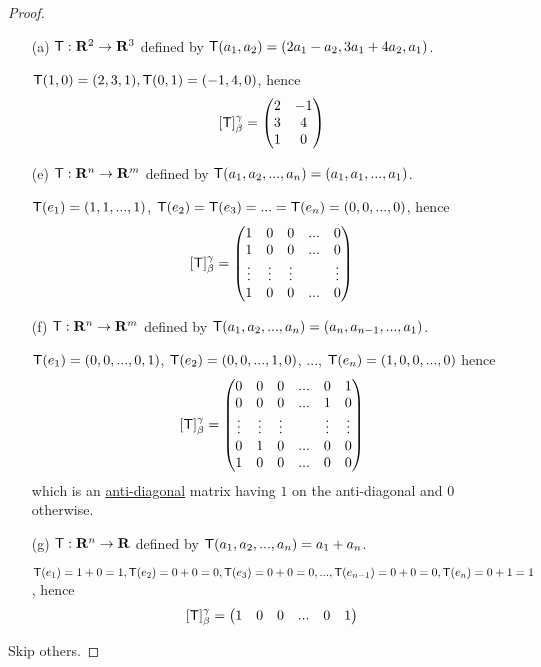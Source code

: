 \begin{proof} \ 

\begin{enumerate}
\item[(a)] \(\textsf{T}: \mathbf{R}^2 \to \mathbf{R}^3\) defined by \(\textsf{T}(a_1, a_2) = (2a_1 - a_2, 3a_1 + 4a_2, a_1)\).

\(\textsf{T}(1, 0) = (2, 3, 1), \textsf{T}(0, 1) = (-1, 4, 0)\), hence
\[
    [\textsf{T}]_{\beta}^{\gamma} = \begin{pmatrix} 2 & -1 \\ 3 & 4 \\ 1 & 0 \end{pmatrix}
\]

\item[(e)] \(\textsf{T}: \mathbf{R}^n \to \mathbf{R}^m\) defined by \(\textsf{T}(a_1, a_2, ..., a_n) = (a_1, a_1, ..., a_1)\).

\(\textsf{T}(e_1) = (1, 1, ..., 1)\),
\(\textsf{T}(e_2) = \textsf{T}(e_3) = ... = \textsf{T}(e_n) = (0, 0, ..., 0)\), hence
\[
    [\textsf{T}]_{\beta}^{\gamma} = \begin{pmatrix}
        1 & 0 & 0 & ... & 0 \\
        1 & 0 & 0 & ... & 0 \\
        \vdots & \vdots & \vdots & & \vdots \\
        1 & 0 & 0 & ... & 0
    \end{pmatrix}
\]

\item[(f)] \(\textsf{T}: \mathbf{R}^n \to \mathbf{R}^m\) defined by \(\textsf{T}(a_1, a_2, ..., a_n) = (a_n, a_{n - 1}, ..., a_1)\).

\(\textsf{T}(e_1) = (0, 0, ..., 0, 1)\), \(\textsf{T}(e_2) = (0, 0, ..., 1, 0)\), ..., \(\textsf{T}(e_n) = (1, 0, 0, ..., 0)\)
hence
\[
    [\textsf{T}]_{\beta}^{\gamma} = \begin{pmatrix}
        0 & 0 & 0 & ... & 0 & 1 \\
        0 & 0 & 0 & ... & 1 & 0 \\
        \vdots & \vdots & \vdots & & \vdots & \vdots \\
        0 & 1 & 0 & ... & 0 & 0 \\
        1 & 0 & 0 & ... & 0 & 0
    \end{pmatrix}
\]
which is an \href{https://www.wikiwand.com/en/Anti-diagonal_matrix}{anti-diagonal} matrix having \(1\) on the anti-diagonal and \(0\) otherwise.

\item[(g)] \(\textsf{T}: \mathbf{R}^n \to \mathbf{R}\) defined by \(\textsf{T}(a_1, a_2, ..., a_n) = a_1 + a_n\).

\(\textsf{T}(e_1) = 1 + 0 = 1, \textsf{T}(e_2) = 0 + 0 = 0, \textsf{T}(e_3) = 0 + 0 = 0, ..., \textsf{T}(e_{n - 1}) = 0 + 0 = 0, \textsf{T}(e_n) = 0 + 1 = 1\),
hence
\[
    [\textsf{T}]_{\beta}^{\gamma} = \begin{pmatrix} 1 & 0 & 0 & ... & 0 & 1 \\ \end{pmatrix}
\]
\end{enumerate}
Skip others.
\end{proof}


